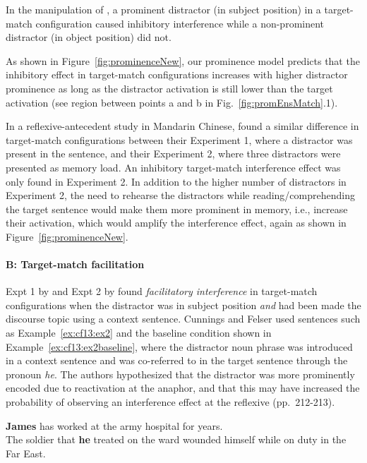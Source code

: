 \documentclass{cambridge7A}\usepackage[]{graphicx}\usepackage[]{color}
\newcommand{\revFE}[1]{#1}
\begin{document}
In the manipulation of \cite{VanDykeMcElree2011}, a prominent distractor (in subject position) in a target-match configuration caused inhibitory interference while a non-prominent distractor (in object position) did not. 
\revFE{
As shown in Figure~\ref{fig:prominenceNew}, our prominence model predicts that the inhibitory effect in target-match configurations increases with higher distractor prominence as long as the distractor activation is still lower than the target activation (see region between points a and b in Fig.~\ref{fig:promEnsMatch}.1).
}

In a reflexive-antecedent study in Mandarin Chinese, \cite{JaegerEngelmannVasishth2015} found a similar difference in target-match configurations between their Experiment 1, where a distractor was present in the sentence, and their Experiment 2, where three distractors were presented as memory load. An inhibitory target-match interference effect was only found in Experiment 2. 
In addition to the higher number of distractors in Experiment 2, the need to rehearse the distractors 
while reading/comprehending the target sentence
 would make them more prominent in memory, i.e., increase their activation, which would amplify the interference effect, again as shown in Figure~\ref{fig:prominenceNew}.

\paragraph{B: Target-match facilitation}
Expt 1 by \cite{Sturt2003} and Expt 2 by \cite{CunningsFelser2013} found  \emph{facilitatory interference} in target-match configurations when the distractor was in subject position \emph{and} had been made the discourse topic using a context sentence.
Cunnings and Felser used sentences such as Example~\ref{ex:cf13:ex2} and the baseline condition shown in Example~\ref{ex:cf13:ex2baseline}, where the distractor noun phrase was introduced in a context sentence and was co-referred to in the target sentence through the pronoun \textit{he}. 
The authors hypothesized that the distractor was more prominently encoded due to reactivation at the anaphor, and that this
may have increased the probability of observing an interference effect at the reflexive (pp.\ 212-213). 
%
\begin{exe} 
\ex\label{ex:cf13:ex2}
\textbf{James} has worked at the army hospital for years. \\
The soldier that \textbf{he} treated on the ward wounded himself while on duty in the Far East.
\end{exe}
\end{document}
